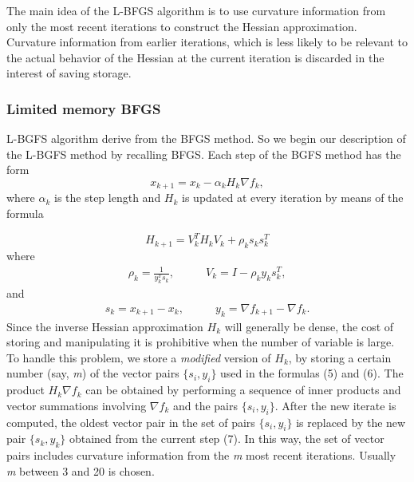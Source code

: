 The main idea of the L-BFGS algorithm is to use curvature information from only the most recent iterations to construct the Hessian approximation. Curvature information from earlier iterations, which is less likely to be relevant to the actual behavior of the Hessian at the current iteration is discarded in the interest of saving storage. 

\subsubsection{Limited memory BFGS}
L-BGFS algorithm derive from the BFGS method. So we begin our description of the L-BGFS method by recalling BFGS. 
Each step of the BGFS method has the form
\begin{equation}
\label{stepBFGS}
x_{k+1}=x_{k}-\alpha_{k}H_{k}\nabla f_{k} ,
\end{equation}
where $\alpha_{k}$ is the step length and $H_{k}$
is updated at every iteration by means of the formula

\begin{equation}
H_{k+1} = V^T_{k}H_{k}V_{k}+ \rho_{k}s_{k}s^T_{k}
\end{equation}
where 
\begin{align}
\rho_{k}=\frac{1}{y^T_{k}s_{k}}, & \qquad V_{k}=I-\rho_{k}y_{k}s^T_{k}, 
\end{align} 
and 
\begin{align}
s_{k}=x_{k+1}-x_{k}, & \qquad
y_{k}=\nabla f_{k+1} - \nabla f_{k}.
\end{align}
Since the inverse Hessian approximation $H_{k}$ will generally be dense, the cost of storing and manipulating it is prohibitive when the number of variable is large. To handle this problem, we store a \textit{modified} version of $H_{k}$, by storing a certain number (say, \textit{m}) of the vector pairs $\{s_{i},y_{i}\}$ used in the formulas (5) and (6). The product $H_{k}\nabla f_{k}$ can be obtained by performing a sequence of inner products and vector summations involving $\nabla f_{k}$ and the pairs $\{s_{i},y_{i}\}$. After the new iterate is computed, the oldest vector pair in the set of pairs $\{s_{i},y_{i}\}$ is replaced by the new pair $\{s_{k},y_{k}\}$ obtained from the current step (7).
In this way, the set of vector pairs includes curvature information from the \textit{m} most recent iterations. Usually \textit{m} between 3 and 20 is chosen. 

